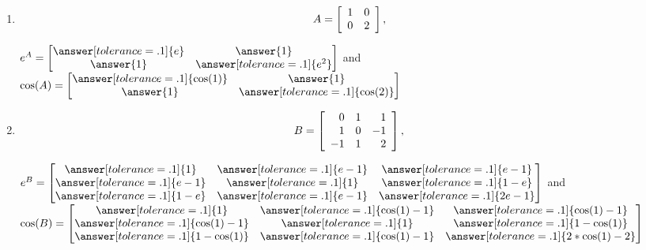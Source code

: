 \documentclass{ximera}
\begin{document}
\begin{problem}
  
  \begin{enumerate}
    \item $$A = \startmat{rr}
      1 & 0 \\
      0 & 2 \\
    \stopmat,$$
    
    $e^A=\begin{bmatrix}
      \answer[tolerance=.1]{e} & \answer{1}\\
      \answer{1} & \answer[tolerance=.1]{e^2}
    \end{bmatrix}$ and $\cos(A)=\begin{bmatrix}
      \answer[tolerance=.1]{\cos(1)} & \answer{1}\\
      \answer{1} & \answer[tolerance=.1]{\cos(2)}
    \end{bmatrix}$


    \item $$B = \startmat{rrr}
      0 & 1 & 1 \\
      1 & 0 & -1 \\
      -1 & 1 & 2 \\
    \stopmat,$$

    $e^B=\begin{bmatrix}
      \answer[tolerance=.1]{1}&\answer[tolerance=.1]{e-1}&\answer[tolerance=.1]{e-1}\\
      \answer[tolerance=.1]{e-1}& \answer[tolerance=.1]{1} & \answer[tolerance=.1]{1-e}\\
      \answer[tolerance=.1]{1-e}& \answer[tolerance=.1]{e-1} & \answer[tolerance=.1]{2e-1}
    \end{bmatrix}$ and $\cos(B)=\begin{bmatrix}
      \answer[tolerance=.1]{1}&\answer[tolerance=.1]{\cos(1)-1}&\answer[tolerance=.1]{\cos(1)-1}\\
      \answer[tolerance=.1]{\cos(1)-1}& \answer[tolerance=.1]{1} & \answer[tolerance=.1]{1-\cos(1)}\\
      \answer[tolerance=.1]{1-\cos(1)}& \answer[tolerance=.1]{\cos(1)-1} & \answer[tolerance=.1]{2*\cos(1)-2}
    \end{bmatrix}$


  \end{enumerate}

  
\end{problem}
\end{document}
